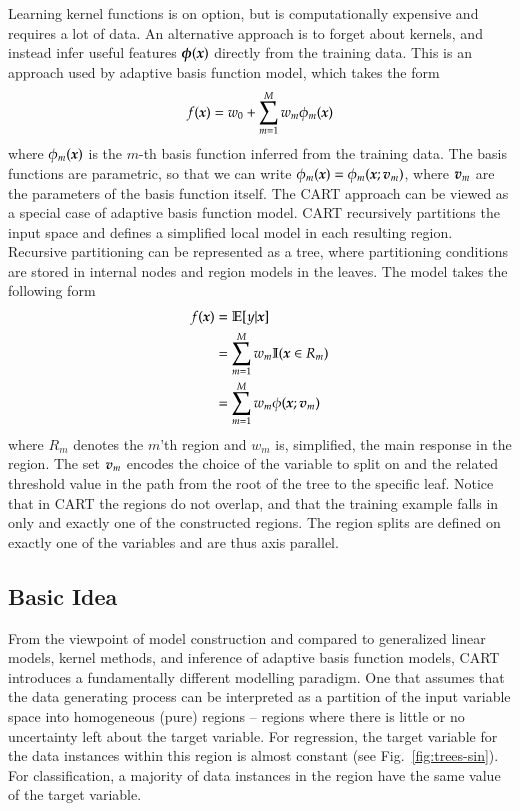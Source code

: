 \begin{refsection}
Learning kernel functions is on option, but is computationally expensive and requires a lot of data. An alternative approach is to forget about kernels, and instead infer useful features $\boldsymbol{\phi}(\boldsymbol{x})$ directly from the training data. This is an approach used by adaptive basis function model, which takes the form
$$ f(\boldsymbol{x})=w_0+\sum_{m=1}^{M} w_m\phi_m(\boldsymbol{x}) $$
where $\phi_m(\boldsymbol{x})$ is the $m$-th basis function inferred from the training data. The basis functions are parametric, so that we can write $\phi_m(\boldsymbol{x})=\phi_m(\boldsymbol{x};\boldsymbol{v}_m)$, where $\boldsymbol{v}_m$ are the parameters of the basis function itself. The CART approach can be viewed as a special case of adaptive basis function model. CART recursively partitions the input space and defines a simplified local model in each resulting region. Recursive partitioning can be represented as a tree, where partitioning conditions are stored in internal nodes and region models in the leaves. The model takes the following form
\begin{align}
f(\boldsymbol{x}) & = \mathbb{E}[y|\boldsymbol{x}] \\
 & = \sum_{m=1}^M w_m \mathbb{I}(\boldsymbol{x}\in R_m) \\
 & = \sum_{m=1}^M w_m\phi(\boldsymbol{x};\boldsymbol{v}_m)
\end{align}
where $R_m$ denotes the $m$'th region and $w_m$ is, simplified, the main response in the region. The set $\boldsymbol{v}_m$ encodes the choice of the variable to split on and the related threshold value in the path from the root of the tree to the specific leaf. Notice that in CART the regions do not overlap, and that the training example falls in only and exactly one of the constructed regions. The region splits are defined on exactly one of the variables and are thus axis parallel.

\subsection*{Basic Idea}

From the viewpoint of model construction and compared to generalized linear models, kernel methods, and inference of adaptive basis function models, CART introduces a fundamentally different modelling paradigm. One that assumes that the data generating process can be interpreted as a partition of the input variable space into homogeneous (pure) regions -- regions where there is little or no uncertainty left about the target variable. For regression, the target variable for the data instances within this region is almost constant (see Fig.~\ref{fig:trees-sin}). For classification, a majority of data instances in the region have the same value of the target variable.


\end{refsection}
